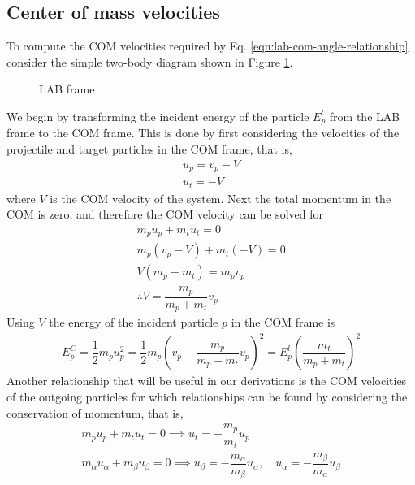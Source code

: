 \documentclass[../main.tex]{subfiles}
\begin{document}
\subsection{Center of mass velocities}
To compute the COM velocities required by Eq. \eqref{eqn:lab-com-angle-relationship} consider the simple two-body diagram shown in Figure \ref{fig:two-body-figure-com}.
\begin{figure}[!htb]
  \centering
  
  \caption{LAB frame}
  \label{fig:two-body-figure-com}
\end{figure}
We begin by transforming the incident energy of the particle $E_p^l$ from the LAB frame to the COM frame. This is done by first considering the velocities of the projectile and target particles in the COM frame, that is,
\begin{subequations}
  \begin{eqnarray*}
    u_p = v_p - V \\
    u_t = -V
  \end{eqnarray*}
\end{subequations}
where $V$ is the COM velocity of the system. Next the total momentum in the COM is zero, and therefore the COM velocity can be solved for
\begin{gather*}
  m_p u_p + m_t u_t = 0 \\
  m_p (v_p - V) + m_t (-V) = 0 \\
  V(m_p + m_t) = m_p v_p \\
  \therefore V = \dfrac{m_p}{m_p + m_t} v_p
\end{gather*}
Using $V$ the energy of the incident particle $p$ in the COM frame is
\begin{gather}
  E_p^C = \dfrac{1}{2} m_p u_p^2 = \dfrac{1}{2} m_p \left( v_p - \dfrac{m_p}{m_p + m_t} v_p \right)^2 = E_p^l \left( \dfrac{m_t}{m_p+m_t} \right)^2
\end{gather}
Another relationship that will be useful in our derivations is the COM velocities of the outgoing particles for which relationships can be found by considering the conservation of momentum, that is,
\begin{gather}
  m_p u_p + m_t u_t = 0 \implies u_t = -\dfrac{m_p}{m_t} u_p \\
  m_{\alpha} u_{\alpha} + m_{\beta} u_{\beta} = 0 \implies u_{\beta} = -\dfrac{m_{\alpha}}{m_{\beta}} u_{\alpha}, \quad u_{\alpha} = -\dfrac{m_{\beta}}{m_{\alpha}} u_{\beta} 
\end{gather} 
\end{document}
